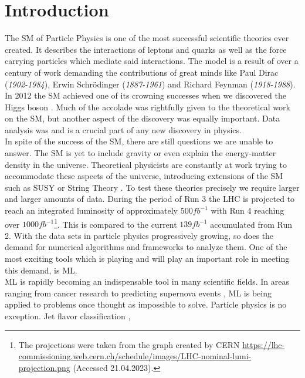 \chapter*{Introduction}
The \ac{SM} of Particle Physics is one of the most successful scientific theories ever
created. It describes the interactions of leptons and quarks as well as the force
carrying particles which mediate said interactions. The model is a result of over a century of work
demanding the contributions of great minds like Paul Dirac (\emph{1902-1984}), Erwin Schrödinger (\emph{1887-1961}) and Richard Feynman (\emph{1918-1988}).
In 2012 the \ac{SM} achieved one of its crowning successes when we discovered the Higgs boson \cite{Aad_2012,the_cms_collaboration_observation_2012}. 
Much of the accolade was rightfully given to the theoretical work on the \ac{SM}, but another aspect of the discovery 
was equally important. Data analysis was and is a crucial part of any new discovery in physics. \newline
\\
In spite of the success of the \ac{SM}, there are still questions we are unable to answer.
The \ac{SM} is yet to include gravity or even explain the energy-matter density in the universe. Theoretical 
physicists are constantly at work trying to accommodate these aspects of the universe,
introducing extensions of the \ac{SM} such as \ac{SUSY} \cite{SUSY} or String Theory \cite{cole_probing_2021}. To test these theories precisely
we require larger and larger amounts of data. During the period of Run 3 the \ac{LHC} is projected to reach an integrated luminosity of approximately  
$500fb^{-1}$ with Run 4 reaching over $1000fb^{-1}$\footnote{The projections were taken from the graph created by CERN
\url{https://lhc-commissioning.web.cern.ch/schedule/images/LHC-nominal-lumi-projection.png}
(Accessed 21.04.2023).}. This is compared to the current $139fb^{-1}$ accumulated from Run 2. With the data sets in particle physics progressively growing, 
so does the demand for numerical algorithms and frameworks to analyze them. One of the most exciting tools which is playing and will play an important role in meeting 
this demand, is \acf{ML}.\newline
\\
\ac{ML} is rapidly becoming an indispensable tool in many scientific fields.
In areas ranging from cancer research \cite{SkinCancer} to predicting supernova events \cite{moller_photometric_2016}, \ac{ML} is being applied to problems
once thought as impossible to solve. Particle physics is no exception. Jet flavor classification \cite{Guest_2016}, 
